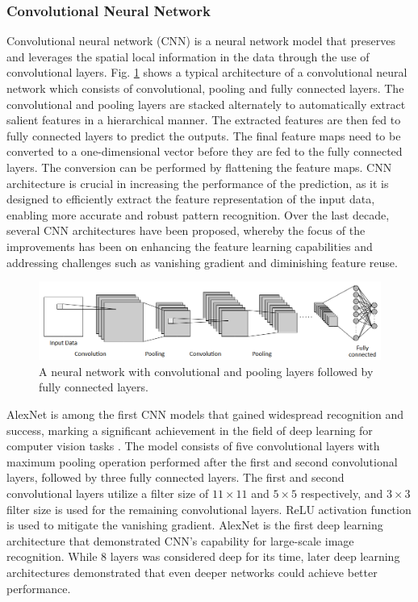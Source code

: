 \documentclass[preprint,12pt]{elsarticle}
\begin{document}
\subsubsection{Convolutional Neural Network} 
Convolutional neural network (CNN) is a neural network model that preserves and leverages the spatial local information in the data through the use of convolutional layers. Fig. \ref{fig_deep_sv_learning_cnn} shows a typical architecture of a convolutional neural network which consists of convolutional, pooling and fully connected layers. The convolutional and pooling layers are stacked alternately to automatically extract salient features in a hierarchical manner. The extracted features are then fed to fully connected layers to predict the outputs. The final feature maps need to be converted to a one-dimensional vector before they are fed to the fully connected layers. The conversion can be performed by flattening the feature maps. CNN architecture is crucial in increasing the performance of the prediction, as it is designed to efficiently extract the feature representation of the input data, enabling more accurate and robust pattern recognition. Over the last decade, several CNN architectures have been proposed, whereby the focus of the improvements has been on enhancing the feature learning capabilities and addressing challenges such as vanishing gradient and diminishing feature reuse.

\begin{figure}[h!]
    \centering
    \includegraphics[scale=0.75]{fig_deep_sv_learning_cnn.png}
    \caption{A neural network with convolutional and pooling layers followed by fully connected layers.}
    \label{fig_deep_sv_learning_cnn}
\end{figure}

AlexNet is among the first CNN models that gained widespread recognition and success, marking a significant achievement in the field of deep learning for computer vision tasks \citep{krizhevsky_imagenet_2012}. The model consists of five convolutional layers with maximum pooling operation performed after the first and second convolutional layers, followed by three fully connected layers. The first and second convolutional layers utilize a filter size of $11 \times 11$ and $5 \times 5$ respectively, and $3 \times 3$ filter size is used for the remaining convolutional layers. ReLU activation function is used to mitigate the vanishing gradient. AlexNet is the first deep learning architecture that demonstrated CNN's capability for large-scale image recognition. While 8 layers was considered deep for its time, later deep learning architectures demonstrated that even deeper networks could achieve better performance.
\end{document}
